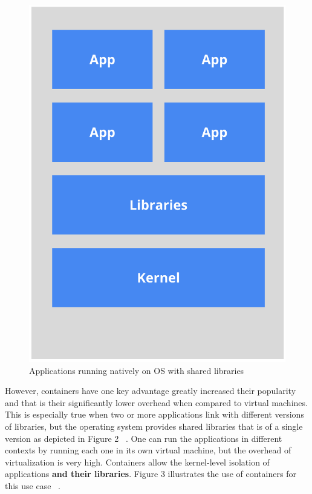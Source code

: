 \documentclass[10pt,twocolumn]{article}
\begin{document}
\begin{figure}[thpb]
  \centering
  	\includegraphics[width=\columnwidth]{native_app_libs}
    \caption{Applications running natively on OS with shared libraries ~\cite{container_shared_lib}}
	\label{fig:native_app_libs}
\end{figure}

However, containers have one key advantage greatly increased their popularity and that is their significantly lower overhead when compared to virtual machines.
This is especially true when two or more applications link with different versions of libraries, but the operating system provides shared libraries that is of a single version as depicted in Figure 2 ~\cite{container_shared_lib}.
One can run the applications in different contexts by running each one in its own virtual machine, but the overhead of virtualization is very high.
Containers allow the kernel-level isolation of applications \textbf{and their libraries}.
Figure 3 illustrates the use of containers for this use case ~\cite{container_shared_lib}.
\end{document}
